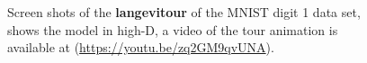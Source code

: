 \documentclass[
  12pt]{article}
\begin{document}
\begin{figure}[H]
\begin{minipage}[t]{0.33\linewidth}
{{}

}

\subcaption{\label{fig-mnist1_sc2}}
\end{minipage}%
%
\begin{minipage}[t]{0.33\linewidth}

{\centering 


}

\subcaption{\label{fig-mnist1_sc3}}
\end{minipage}%

\caption{\label{fig-mnist1_sc}Screen shots of the \textbf{langevitour}
of the MNIST digit 1 data set, shows the model in high-D, a video of the
tour animation is available at (\url{https://youtu.be/zq2GM9qvUNA}).}

\end{figure}
\end{document}
